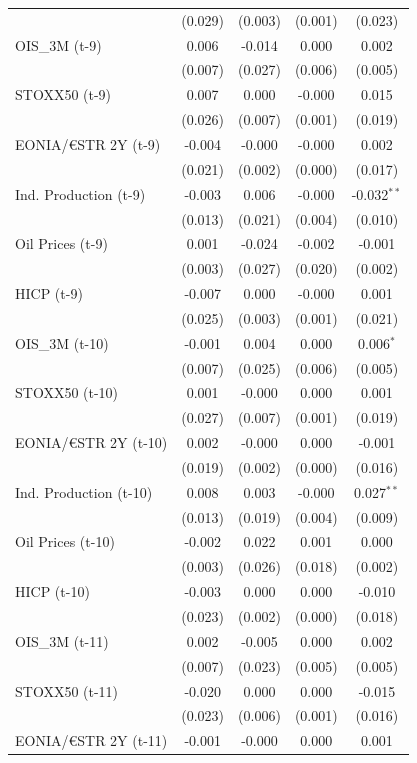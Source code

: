 \begin{longtable}[t]{lcccc}
 & (0.029) & (0.003) & (0.001) & (0.023)\\
OIS\_3M (t-9) & 0.006 & -0.014 & 0.000 & 0.002\\
 & (0.007) & (0.027) & (0.006) & (0.005)\\
STOXX50 (t-9) & 0.007 & 0.000 & -0.000 & 0.015\\
 & (0.026) & (0.007) & (0.001) & (0.019)\\
EONIA/€STR 2Y (t-9) & -0.004 & -0.000 & -0.000 & 0.002\\
 & (0.021) & (0.002) & (0.000) & (0.017)\\
Ind. Production (t-9) & -0.003 & 0.006 & -0.000 & -0.032$^{**}$\\
 & (0.013) & (0.021) & (0.004) & (0.010)\\
Oil Prices (t-9) & 0.001 & -0.024 & -0.002 & -0.001\\
 & (0.003) & (0.027) & (0.020) & (0.002)\\
HICP (t-9) & -0.007 & 0.000 & -0.000 & 0.001\\
 & (0.025) & (0.003) & (0.001) & (0.021)\\
OIS\_3M (t-10) & -0.001 & 0.004 & 0.000 & 0.006$^{*}$\\
 & (0.007) & (0.025) & (0.006) & (0.005)\\
STOXX50 (t-10) & 0.001 & -0.000 & 0.000 & 0.001\\
 & (0.027) & (0.007) & (0.001) & (0.019)\\
EONIA/€STR 2Y (t-10) & 0.002 & -0.000 & 0.000 & -0.001\\
 & (0.019) & (0.002) & (0.000) & (0.016)\\
Ind. Production (t-10) & 0.008 & 0.003 & -0.000 & 0.027$^{**}$\\
 & (0.013) & (0.019) & (0.004) & (0.009)\\
Oil Prices (t-10) & -0.002 & 0.022 & 0.001 & 0.000\\
 & (0.003) & (0.026) & (0.018) & (0.002)\\
HICP (t-10) & -0.003 & 0.000 & 0.000 & -0.010\\
 & (0.023) & (0.002) & (0.000) & (0.018)\\
OIS\_3M (t-11) & 0.002 & -0.005 & 0.000 & 0.002\\
 & (0.007) & (0.023) & (0.005) & (0.005)\\
STOXX50 (t-11) & -0.020 & 0.000 & 0.000 & -0.015\\
 & (0.023) & (0.006) & (0.001) & (0.016)\\
EONIA/€STR 2Y (t-11) & -0.001 & -0.000 & 0.000 & 0.001\\

\end{longtable}
